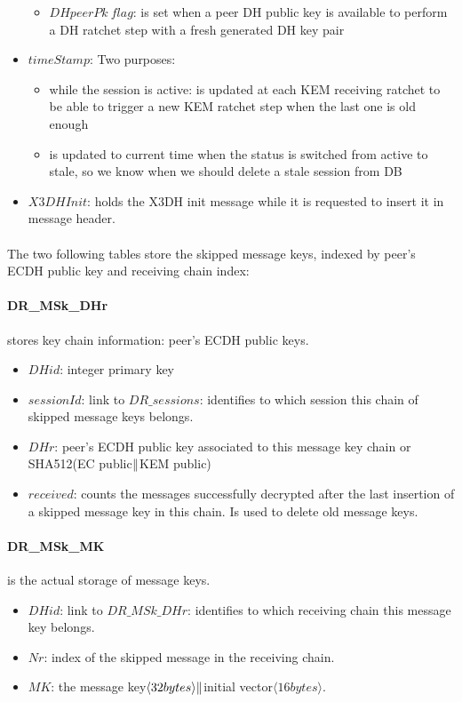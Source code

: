 \documentclass[a4paper,11pt]{article}
\begin{document}
\begin{itemize}
\begin{itemize}
          \item $DH peer Pk\ flag$: is set when a peer DH public key is available to perform a DH ratchet step with a fresh generated DH key pair 
        \end{itemize}
      \item $timeStamp$: Two purposes:
        \begin{itemize}
          \item while the session is active: is updated at each KEM receiving ratchet to be able to trigger a new KEM ratchet step when the last one is old enough
          \item is updated to current time when the status is switched from active to stale, so we know when we should delete a stale session from DB
        \end{itemize}
      \item $X3DHInit$: holds the X3DH init message while it is requested to insert it in message header.
    \end{itemize}

    \paragraph*{}The two following tables store the skipped message keys, indexed by peer's ECDH public key and receiving chain index:
    \paragraph*{DR\_MSk\_DHr} stores key chain information: peer's ECDH public keys.
    \begin{itemize}
      \item $DHid$: integer primary key
      \item $sessionId$: link to $DR\_sessions$: identifies to which session this chain of skipped message keys belongs.
      \item $DHr$: peer's ECDH public key associated to this message key chain or SHA512(EC public$\Arrowvert $KEM public)
      \item $received$: counts the messages successfully decrypted after the last insertion of a skipped message key in this chain. Is used to delete old message keys.
    \end{itemize}

    \paragraph*{DR\_MSk\_MK} is the actual storage of message keys.
    \begin{itemize}
      \item $DHid$: link to $DR\_MSk\_DHr$: identifies to which receiving chain this message key belongs.
      \item $Nr$: index of the skipped message in the receiving chain.
      \item $MK$: the message key$\langle 32bytes\rangle  \Arrowvert $initial vector$\langle 16bytes\rangle $.
    \end{itemize}
\end{document}

